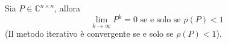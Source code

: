 \begin{theo}[Convergenza]
Sia $P \in \mathbb{C}^{n\times n}$, allora
$$ \lim_{k \to \infty} P^{k} = 0 \text { se e solo se } 
\rho(P) < 1
$$
(Il metodo iterativo \`e convergente se e solo se $\rho(P)<1$).
\end{theo}






